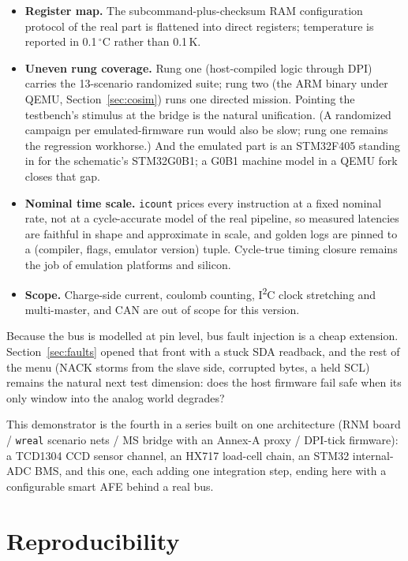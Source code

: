 \documentclass[11pt]{article}
\newcommand{\iic}{I\textsuperscript{2}C}
\begin{document}
\begin{itemize}
  \item \textbf{Register map.}  The subcommand-plus-checksum RAM
    configuration protocol of the real part is flattened into direct
    registers; temperature is reported in 0.1\,$^\circ$C rather than
    0.1\,K.
  \item \textbf{Uneven rung coverage.}  Rung one (host-compiled
    logic through DPI) carries the 13-scenario randomized
    suite; rung two (the ARM binary under QEMU,
    Section~\ref{sec:cosim}) runs one directed mission.  Pointing
    the testbench's stimulus at the bridge is the natural
    unification.  (A randomized campaign per emulated-firmware run
    would also be slow; rung one remains the regression workhorse.)
    And the emulated part is an STM32F405 standing in for the
    schematic's STM32G0B1; a G0B1 machine model in a QEMU fork closes
    that gap.
  \item \textbf{Nominal time scale.}  \texttt{icount} prices every
    instruction at a fixed nominal rate, not at a cycle-accurate
    model of the real pipeline, so measured latencies are faithful
    in shape and approximate in scale, and golden logs are pinned to
    a (compiler, flags, emulator version) tuple.  Cycle-true timing
    closure remains the job of emulation platforms and silicon.
  \item \textbf{Scope.}  Charge-side current, coulomb counting,
    \iic{} clock stretching and multi-master, and CAN are out of
    scope for this version.
\end{itemize}

Because the bus is modelled at pin level, bus fault injection is a
cheap extension.
Section~\ref{sec:faults} opened that front with a stuck SDA readback,
and the rest of the menu (NACK storms from the slave side, corrupted
bytes, a held SCL) remains the natural next test dimension: does the
host firmware fail safe when its only window into the analog world
degrades?

This demonstrator is the fourth in a series built on one architecture
(RNM board / \texttt{wreal} scenario nets / MS bridge with an
Annex-A proxy / DPI-tick firmware): a TCD1304 CCD sensor channel, an
HX717 load-cell chain, an STM32 internal-ADC BMS, and this one,
each adding one integration step, ending here with a configurable
smart AFE behind a real bus.

\section{Reproducibility}
\label{sec:repro}
\end{document}
